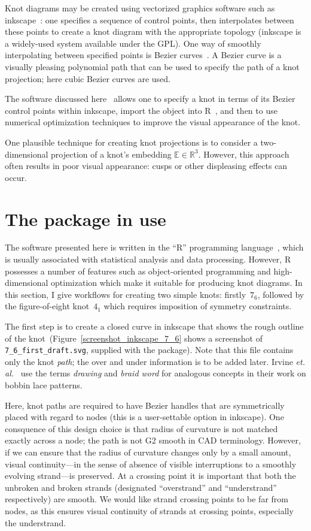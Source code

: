 \documentclass{birkjour}
\theoremstyle{definition}
\theoremstyle{remark}
\numberwithin{equation}{section}
\begin{document}
Knot diagrams may be created using vectorized graphics software such
as inkscape~\cite{Inkscape}: one specifies a sequence of control
points, then interpolates between these points to create a knot
diagram with the appropriate topology (inkscape is a widely-used
system available under the GPL).  One way of smoothly interpolating
between specified points is Bezier curves~\cite{olsen2014}.  A Bezier
curve is a visually pleasing polynomial path that can be used to
specify the path of a knot projection; here cubic Bezier curves are
used.

The software discussed here~\cite{hankin2020} allows one to specify a
knot in terms of its Bezier control points within inkscape, import the
object into R~\cite{rcore2021}, and then to use numerical optimization
techniques to improve the visual appearance of the knot.

One plausible technique for creating knot projections is to consider a
two-dimensional projection of a knot's embedding
$\mathbb{E}\in\mathbb{R}^3$.  However, this approach often results in
poor visual appearance: cusps or other displeasing effects can occur.

\section{The package in use}

The software presented here is written in the ``R'' programming
language~\cite{rcore2021}, which is usually associated with
statistical analysis and data processing.  However, R possesses a
number of features such as object-oriented programming and
high-dimensional optimization which make it suitable for producing
knot diagrams.  In this section, I give workflows for creating two
simple knots: firstly~$7_6$, followed by the figure-of-eight
knot~$4_1$ which requires imposition of symmetry constraints.

The first step is to create a closed curve in inkscape that shows the
rough outline of the knot~(Figure~\ref{screenshot_inkscape_7_6} shows
a screenshot of {\tt 7\_6\_first\_draft.svg}, supplied with the
package).  Note that this file contains only the knot {\em path}; the
over and under information is to be added later.  Irvine {\em
  et. al.}~\cite{irvine2020} use the terms {\em drawing} and {\em
  braid word} for analogous concepts in their work on bobbin lace
patterns.

Here, knot paths are required to have Bezier handles that are
symmetrically placed with regard to nodes (this is a user-settable
option in inkscape).  One consquence of this design choice is that
radius of curvature is not matched exactly across a node; the path is
not G2 smooth in CAD terminology.  However, if we can ensure that the
radius of curvature changes only by a small amount, visual
continuity---in the sense of absence of visible interruptions to a
smoothly evolving strand---is preserved.  At a crossing point it is
important that both the unbroken and broken strands (designated
``overstrand'' and ``understrand'' respectively) are smooth.  We would
like strand crossing points to be far from nodes, as this ensures
visual continuity of strands at crossing points, especially the
understrand.
\end{document}
